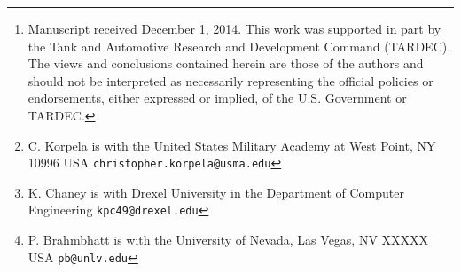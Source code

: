 \author{Christopher Korpela, Kenneth Chaney, and Pareshkumar Brahmbhatt
\thanks{Manuscript received December 1, 2014. This work was supported in part by the Tank and Automotive Research and Development Command (TARDEC). The views and conclusions contained herein are those of the authors and should not be interpreted as necessarily representing the official policies or endorsements, either expressed or implied, of the U.S. Government or TARDEC.}
\thanks{C. Korpela is with the United States Military Academy at West Point, NY 10996 USA \tt\small{christopher.korpela{@}usma.edu}}
\thanks{K. Chaney is with Drexel University in the Department of Computer Engineering \tt\small{kpc49{@}drexel.edu}}
\thanks{P. Brahmbhatt is with the University of Nevada, Las Vegas, NV XXXXX USA \tt\small{pb{@}unlv.edu}}}

